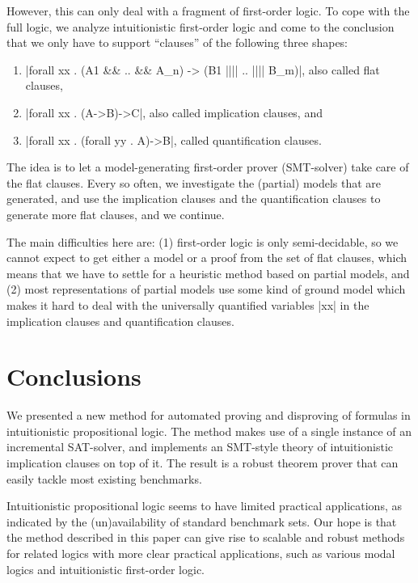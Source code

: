 \documentclass{llncs}
\begin{document}
However, this can only deal with a fragment of first-order logic. To cope with the full logic,
we analyze intuitionistic first-order logic and come to the conclusion that we only have to support ``clauses'' of the following three shapes:
\begin{enumerate}
\item |forall xx . (A1 && .. && A_n) -> (B1 |||| .. |||| B_m)|, also called flat clauses,
\item |forall xx . (A->B)->C|, also called implication clauses, and
\item |forall xx . (forall yy . A)->B|, called quantification clauses.
\end{enumerate}
The idea is to let a model-generating first-order prover (SMT-solver) take care of the flat clauses. Every so often, we investigate the (partial) models that are generated, and use the implication clauses and the quantification clauses to generate more flat clauses, and we continue.

The main difficulties here are: (1) first-order logic is only semi-decidable, so we cannot expect to get either a model or a proof from the set of flat clauses, which means that we have to settle for a heuristic method based on partial models, and (2) most representations of partial models use some kind of ground model which makes it hard to deal with the universally quantified variables |xx| in the implication clauses and quantification clauses.


\section{Conclusions}

We presented a new method for automated proving and disproving of formulas in intuitionistic propositional logic. The method makes use of a single instance of an incremental SAT-solver, and implements an SMT-style theory of intuitionistic implication clauses on top of it. The result is a robust theorem prover that can easily tackle most existing benchmarks.

Intuitionistic propositional logic seems to have limited practical applications, as indicated by the (un)availability of standard benchmark sets. Our hope is that the method described in this paper can give rise to scalable and robust methods for related logics with more clear practical applications, such as various modal logics and intuitionistic first-order logic.
\end{document}
